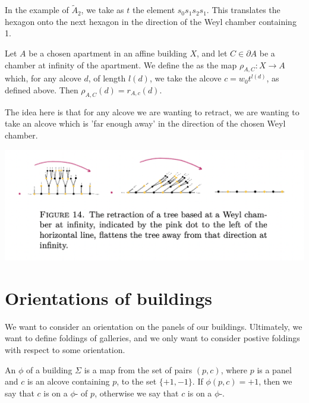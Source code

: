 \documentclass[11pt]{article}
\begin{document}
In the example of $\tilde{A}_2$, we take as $t$ the element $s_0s_1s_2s_1$. This translates the hexagon onto the next hexagon in the direction of the Weyl chamber containing 1. 

\begin{definition}
    Let $A$ be a chosen apartment in an affine building $X$, and let $C\in \partial A$ be a chamber at infinity of the apartment. We define the  as the map $\rho_{A,C}:X\longrightarrow A$ which, for any alcove $d$, of length $l(d)$, we take the alcove $c=w_0t^{l(d)}$, as defined above. Then $\rho_{A,C}(d)=r_{A,c}(d)$.
    
\end{definition}
The idea here is that for any alcove we are wanting to retract, we are wanting to take an alcove which is 'far enough away' in the direction of the chosen Weyl chamber. 

\includegraphics[scale=0.7]{Screenshot 2023-02-15 at 13.31.58.png}


\section{Orientations of buildings}\label{6}

We want to consider an orientation on the panels of our buildings. Ultimately, we want to define foldings of galleries, and we only want to consider postive foldings with respect to some orientation.


\begin{definition}
    An  $\phi$ of a building $\Sigma$ is a map from the set of pairs $(p,c)$, where $p$ is a panel and $c$ is an alcove containing $p$, to the set $\{+1,-1\}$. If $\phi (p,c)=+1$, then we say that $c$ is on a $\phi$- of $p$, otherwise we say that $c$ is on a $\phi$-. 
\end{definition}
\end{document}
